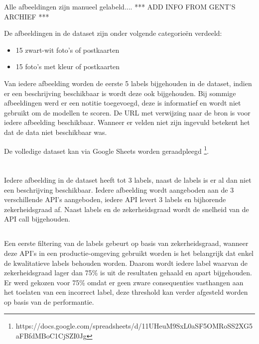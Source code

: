 Alle afbeeldingen zijn manueel gelabeld.... 
*** ADD INFO FROM GENT'S ARCHIEF ***

De afbeeldingen in de dataset zijn onder volgende categorieën verdeeld:
 \begin{itemize}
    \item 15 zwart-wit foto's of postkaarten
    \item 15 foto's met kleur of postkaarten
\end{itemize}

Van iedere afbeelding worden de eerste 5 labels bijgehouden in de dataset, indien er een beschrijving beschikbaar is wordt deze ook bijgehouden. Bij sommige afbeeldingen werd er een notitie toegevoegd, deze is informatief en wordt niet gebruikt om de modellen te scoren. De URL met verwijzing naar de bron is voor iedere afbeelding beschikbaar. Wanneer er velden niet zijn ingevuld betekent het dat de data niet beschikbaar was. 

De volledige dataset kan via Google Sheets worden geraadpleegd \footnote{https://docs.google.com/spreadsheets/d/11UHeuM9SxL0aSF5OMRoSS2XG5aFBfdMBoC1CjSZI0Jg}.

\section{}
\label{sec:scoren-van-computer-vision}
Iedere afbeelding in de dataset heeft tot 3 labels, naast de labels is er al dan niet een beschrijving beschikbaar. Iedere afbeelding wordt aangeboden aan de 3 verschillende API's aangeboden, iedere API levert 3 labels en bijhorende zekerheidsgraad af. Naast labels en de zekerheidsgraad wordt de snelheid van de API call bijgehouden.

\subsection{}
\label{sec:scoren-van-labels}
Een eerste filtering van de labels gebeurt op basis van zekerheidsgraad, wanneer deze API's in een productie-omgeving gebruikt worden is het belangrijk dat enkel de kwalitatieve labels behouden worden. Daarom wordt iedere label waarvan de zekerheidsgraad lager dan 75\% is uit de resultaten gehaald en apart bijgehouden. Er werd gekozen voor 75\% omdat er geen zware consequenties vasthangen aan het toelaten van een incorrect label, deze threshold kan verder afgesteld worden op basis van de performantie.

